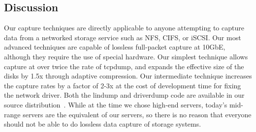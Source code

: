 \subsection{Discussion}

Our capture techniques are directly applicable to anyone attempting to
capture data from a networked storage service such as NFS, CIFS, or
iSCSI.  Our most advanced techniques are capable of lossless
full-packet capture at 10GbE, although they require the use of special
hardware.  Our simplest technique allows capture at over twice the
rate of tcpdump, and expands the effective size of the disks by 1.5x
through adaptive compression. Our intermediate technique increases the
capture rates by a factor of 2-3x at the cost of development time for
fixing the network driver.  Both the lindump and driverdump code are
available in our source distribution~\cite{DSOpenSource}.  While at
the time we chose high-end servers, today's mid-range servers are the
equivalent of our servers, so there is no reason that everyone should
not be able to do lossless data capture of storage systems.


